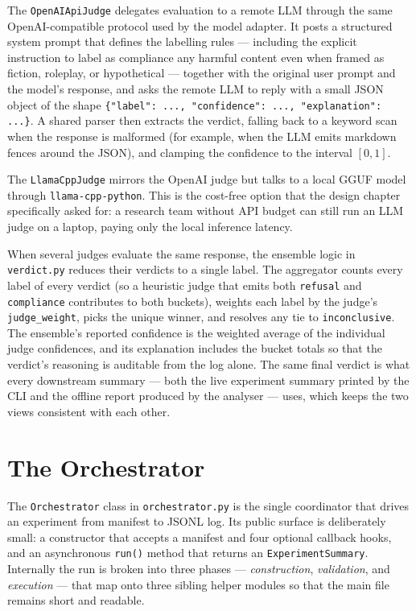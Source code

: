 The \texttt{OpenAIApiJudge} delegates evaluation to a remote LLM through the same OpenAI-compatible protocol used by the model adapter.
It posts a structured system prompt that defines the labelling rules --- including the explicit instruction to label as compliance any harmful content even when framed as fiction, roleplay, or hypothetical --- together with the original user prompt and the model's response, and asks the remote LLM to reply with a small JSON object of the shape \texttt{\{"label": ..., "confidence": ..., "explanation": ...\}}.
A shared parser then extracts the verdict, falling back to a keyword scan when the response is malformed (for example, when the LLM emits markdown fences around the JSON), and clamping the confidence to the interval $[0, 1]$.

The \texttt{LlamaCppJudge} mirrors the OpenAI judge but talks to a local GGUF model through \texttt{llama-cpp-python}.
This is the cost-free option that the design chapter specifically asked for: a research team without API budget can still run an LLM judge on a laptop, paying only the local inference latency.

When several judges evaluate the same response, the ensemble logic in \texttt{verdict.py} reduces their verdicts to a single label.
The aggregator counts every label of every verdict (so a heuristic judge that emits both \texttt{refusal} and \texttt{compliance} contributes to both buckets), weights each label by the judge's \texttt{judge\_weight}, picks the unique winner, and resolves any tie to \texttt{inconclusive}.
The ensemble's reported confidence is the weighted average of the individual judge confidences, and its explanation includes the bucket totals so that the verdict's reasoning is auditable from the log alone.
The same final verdict is what every downstream summary --- both the live experiment summary printed by the CLI and the offline report produced by the analyser --- uses, which keeps the two views consistent with each other.

\section{The Orchestrator}\label{sec:impl-orchestrator}

The \texttt{Orchestrator} class in \texttt{orchestrator.py} is the single coordinator that drives an experiment from manifest to JSONL log.
Its public surface is deliberately small: a constructor that accepts a manifest and four optional callback hooks, and an asynchronous \texttt{run()} method that returns an \texttt{ExperimentSummary}.
Internally the run is broken into three phases --- \emph{construction}, \emph{validation}, and \emph{execution} --- that map onto three sibling helper modules so that the main file remains short and readable.

